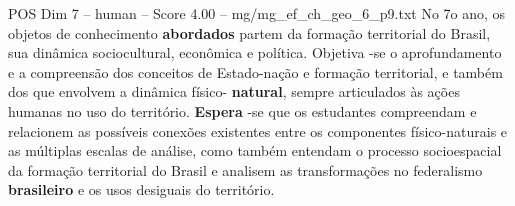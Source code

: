 \begin{textsample}{POS Dim 7 – human – Score 4.00 – mg/mg\_ef\_ch\_geo\_6\_p9.txt}  \label{ex:f7_pos_002}
No 7o ano, os objetos de conhecimento \textbf{abordados} partem da formação territorial do Brasil, sua dinâmica sociocultural, econômica e política.
Objetiva -se o aprofundamento e a compreensão dos conceitos de Estado-nação e formação territorial, e também dos que envolvem a dinâmica físico- \textbf{natural}, sempre articulados às ações humanas no uso do território. \textbf{Espera} -se que os estudantes compreendam e relacionem as possíveis conexões existentes entre os componentes físico-naturais e as múltiplas escalas de análise, como também entendam o processo socioespacial da formação territorial do Brasil e analisem as transformações no federalismo \textbf{brasileiro} e os usos desiguais do território.

\end{textsample}
